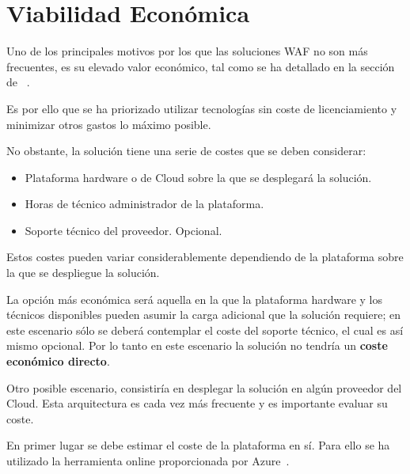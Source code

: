 \section{Viabilidad Económica}
\par Uno de los principales motivos por los que las soluciones WAF no son más frecuentes, es su elevado valor económico, tal como se ha detallado en la sección de ~.
\par Es por ello que se ha priorizado utilizar tecnologías sin coste de licenciamiento y minimizar otros gastos lo máximo posible.
\par No obstante, la solución tiene una serie de costes que se deben considerar:
\begin{itemize}
  \item Plataforma hardware o de Cloud sobre la que se desplegará la solución.
  \item Horas de técnico administrador de la plataforma.
  \item Soporte técnico del proveedor. Opcional.
\end{itemize}

\par Estos costes pueden variar considerablemente dependiendo de la plataforma sobre la que se despliegue la solución.
\par La opción más económica será aquella en la que la plataforma hardware y los técnicos disponibles pueden asumir la carga adicional que la solución requiere; en este escenario sólo se deberá contemplar el coste del
soporte técnico, el cual es así mismo opcional. Por lo tanto en este escenario la solución no tendría un {\bf coste económico directo}.

\par Otro posible escenario, consistiría en desplegar la solución en algún proveedor del Cloud. Esta arquitectura es cada vez más frecuente y es importante evaluar su coste.
\par En primer lugar se debe estimar el coste de la plataforma en sí. Para ello se ha utilizado la herramienta online proporcionada por Azure~\cite{azurecalculator}.


